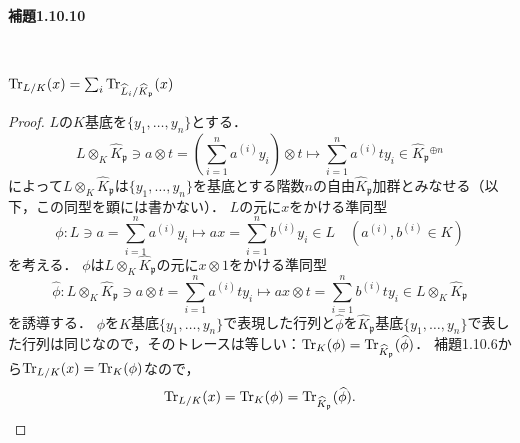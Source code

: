 \paragraph{補題1.10.10}~
\begin{screen}
  $\operatorname{Tr}_{L/K}(x)=\sum_i\operatorname{Tr}_{\widehat{L}_i/\widehat{K}_\mathfrak{p}}(x)$
\end{screen}
\begin{proof}
  $L$の$K$基底を$\{y_1, \ldots, y_n\}$とする．
  \[L \otimes_K \widehat{K}_\mathfrak{p} \ni a \otimes t = \left(\sum_{i=1}^n a^{(i)} y_i\right) \otimes t \mapsto \sum_{i=1}^n a^{(i)}t y_i \in  \widehat{K}_\mathfrak{p}{}^{\oplus n}\]
  によって$L \otimes_K \widehat{K}_\mathfrak{p}$は$\{y_1, \ldots, y_n\}$を基底とする階数$n$の自由$\widehat{K}_\mathfrak{p}$加群とみなせる（以下，この同型を顕には書かない）．
  $L$の元に$x$をかける準同型
  \[\phi\colon L\ni a = \sum_{i=1}^n a^{(i)} y_i \mapsto ax = \sum_{i=1}^n b^{(i)} y_i \in L \quad (a^{(i)},b^{(i)}\in K)\]
  を考える．
  $\phi$は$L\otimes_K\widehat{K}_\mathfrak{p}$の元に$x\otimes1$をかける準同型
  \[\widehat{\phi} \colon L \otimes_K \widehat{K}_\mathfrak{p} \ni a \otimes t = \sum_{i=1}^n a^{(i)}t y_i \mapsto ax \otimes t = \sum_{i=1}^n b^{(i)}t y_i \in L\otimes_K\widehat{K}_\mathfrak{p}\]
  を誘導する．
  $\phi$を$K$基底$\{y_1, \ldots, y_n\}$で表現した行列と$\widehat{\phi}$を$\widehat{K}_\mathfrak{p}$基底$\{y_1, \ldots, y_n\}$で表した行列は同じなので，そのトレースは等しい：$\operatorname{Tr}_K(\phi)=\operatorname{Tr}_{\widehat{K}_\mathfrak{p}}(\widehat{\phi})$．
  補題1.10.6から$\operatorname{Tr}_{L/K}(x)=\operatorname{Tr}_K(\phi)$なので，
  \[\operatorname{Tr}_{L/K}(x)=\operatorname{Tr}_K(\phi)=\operatorname{Tr}_{\widehat{K}_\mathfrak{p}}(\widehat{\phi}).\]


\end{proof}
